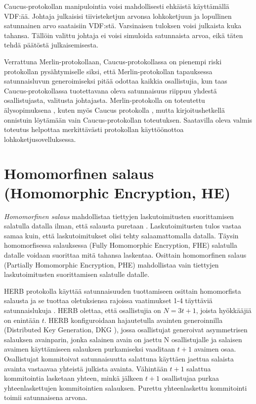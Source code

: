 Caucus-protokollan manipulointia voisi mahdollisesti ehkäistä käyttämällä VDF:ää. Johtaja julkaisisi tiivisteketjun arvonsa lohkoketjuun ja lopullinen satunnainen arvo saataisiin VDF:stä. Varsinaisen tuloksen voisi julkaista kuka tahansa. Tällöin valittu johtaja ei voisi simuloida satunnaista arvoa, eikä täten tehdä päätöstä julkaisemisesta.

Verrattuna Merlin-protokollaan, Caucus-protokollassa on pienempi riski protokollan pysähtymiselle siksi, että Merlin-protokollan tapauksessa satunnaisluvun generoimiseksi pitää odottaa kaikkia osallistujia, kun taas Caucus-protokollassa tuotettavana oleva satunnaisuus riippuu yhdestä osallistujasta, valitusta johtajasta. Merlin-protokolla on toteutettu älysopimuksena  \cite{MerlinChains}, kuten myös Caucus protokolla \cite{DBLP:journals/corr/abs-1801-07965}, mutta kirjoitushetkellä onnistuin löytämään vain Caucus-protokollan toteutuksen. Saatavilla oleva valmis toteutus helpottaa merkittävästi protokollan käyttöönottoa lohkoketjusovelluksessa.




\section{Homomorfinen salaus (Homomorphic Encryption, HE)}

\textit{Homomorfinen salaus} mahdollistaa tiettyjen laskutoimitusten suorittamisen salatulla datalla ilman, että salausta puretaan \cite{alma9928100443506253}. Laskutoimitusten tulos vastaa samaa kuin, että laskutoimitukset olisi tehty salaamattomalla datalla. Täysin homomorfisessa salauksessa (Fully Homomorphic Encryption, FHE) salatulla datalle voidaan suorittaa mitä tahansa laskentaa. Osittain homomorfinen salaus (Partially Homomorphic Encryption, PHE) mahdollistaa vain tiettyjen laskutoimitusten suorittamisen salatulle datalle.

HERB protokolla käyttää satunnaisuuden tuottamiseen osittain homomorfista salausta ja se tuottaa oletuksiensa rajoissa vaatimukset 1-4 täyttäviä satunnaislukuja \cite{cherniaeva2019homomorphic}. HERB olettaa, että osallistujia on $N=3t+1$, joista hyökkääjiä on enintään $t$. HERB konfiguroidaan hajautetulla avainten generoinnilla (Distributed Key Generation, DKG \cite{pedersen1991threshold}), jossa osallistujat generoivat asymmetrisen salauksen avainparin, jonka salainen avain on jaettu N osallistujalle ja salaisen avaimen käyttämiseen salauksen purkamiseksi vaaditaan $t+1$ avaimen osaa. Osallistujat kommitoivat satunnaisuutta salattuna käyttäen jaettua salaista avainta vastaavaa yhteistä julkista avainta. Vähintään $t+1$ salattua kommitointia lasketaan yhteen, minkä jälkeen $t+1$ osallistujaa purkaa yhteenlaskettujen kommitointien salauksen. Purettu yhteenlaskettu kommitointi toimii satunnaisena arvona. 

